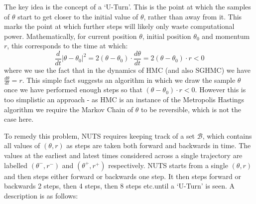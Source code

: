 The key idea is the concept of a `U-Turn'. This is the point at which the samples of $\theta$ start to get closer to the initial value of $\theta$, rather than away from it. This marks the point at which further steps will likely only waste computational power. Mathematically, for current position $\theta$, initial position $\theta_0$ and momentum $r$, this corresponds to the time at which:
$$ \frac{d}{dt} |\theta - \theta_0|^2 = 2(\theta - \theta_0)\cdot\frac{d\theta}{dt} = 2(\theta - \theta_0)\cdot r< 0$$
where we use the fact that in the dynamics of HMC (and also SGHMC) we have $\frac{d\theta}{dt} = r$. This simple fact suggests an algorithm in which we draw the sample $\theta$ once we have performed enough steps so that $(\theta - \theta_0)\cdot r< 0$. However this is too simplistic an approach - as HMC is an instance of the Metropolis Hastings algorithm we require the Markov Chain of $\theta$ to be reversible, which is not the case here.

To remedy this problem, NUTS requires keeping track of a set $\mathcal{B}$, which contains all values of $(\theta, r)$ as steps are taken both forward and backwards in time. The values at the earliest and latest times considered across a single trajectory are labelled  $(\theta^-, r^-)$ and $(\theta^+, r^+)$ respectively. NUTS starts from a single $(\theta, r)$ and then steps either forward or backwards one step. It then steps forward or backwards 2 steps, then 4 steps, then 8 steps etc.\@ until a `U-Turn' is seen. A description is as follows:

